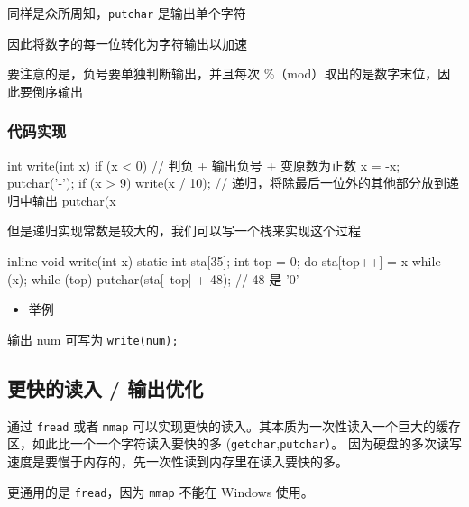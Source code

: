 同样是众所周知，\texttt{putchar} 是输出单个字符

因此将数字的每一位转化为字符输出以加速

要注意的是，负号要单独判断输出，并且每次 \%（mod）取出的是数字末位，因此要倒序输出

\subsubsection{代码实现}

\begin{cppcode}
int write(int x) {
  if (x < 0) {  // 判负 + 输出负号 + 变原数为正数
    x = -x;
    putchar('-');
  }
  if (x > 9) write(x / 10);  // 递归，将除最后一位外的其他部分放到递归中输出
  putchar(x %
}
\end{cppcode}

但是递归实现常数是较大的，我们可以写一个栈来实现这个过程

\begin{cppcode}
inline void write(int x) {
  static int sta[35];
  int top = 0;
  do {
    sta[top++] = x %
  } while (x);
  while (top) putchar(sta[--top] + 48);  // 48 是 '0'
}
\end{cppcode}

\begin{itemize}
\item 举例
\end{itemize}

输出 num 可写为 \texttt{write(num);}

\subsection{更快的读入 / 输出优化}

通过 \texttt{fread} 或者 \texttt{mmap} 可以实现更快的读入。其本质为一次性读入一个巨大的缓存区，如此比一个一个字符读入要快的多 (\texttt{getchar},\texttt{putchar}）。 因为硬盘的多次读写速度是要慢于内存的，先一次性读到内存里在读入要快的多。

更通用的是 \texttt{fread}，因为 \texttt{mmap} 不能在 Windows 使用。

